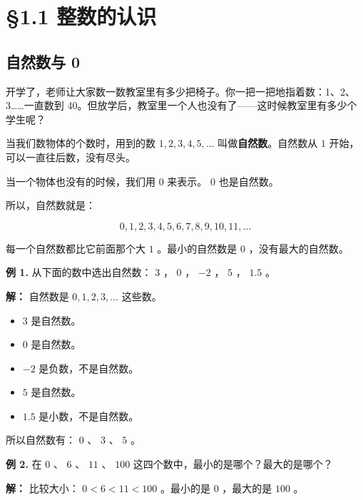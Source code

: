 \chapter{§1.1 整数的认识}
\label{sec:1.1}




\section*{自然数与 0}


\begin{explore}


开学了，老师让大家数一数教室里有多少把椅子。你一把一把地指着数：1、2、3……一直数到 40。但放学后，教室里一个人也没有了——这时候教室里有多少个学生呢？

\end{explore}

\begin{understand}


当我们数物体的个数时，用到的数 $1, 2, 3, 4, 5, \ldots$ 叫做\textbf{自然数}。自然数从 $1$ 开始，可以一直往后数，没有尽头。

当一个物体也没有的时候，我们用 \textbf{ $0$ } 来表示。 $0$ 也是自然数。

所以，自然数就是：

\[
0, 1, 2, 3, 4, 5, 6, 7, 8, 9, 10, 11, \ldots
\]


每一个自然数都比它前面那个大 $1$ 。最小的自然数是 $0$ ，没有最大的自然数。

\end{understand}

\begin{workedexamples}


\textbf{例 1.} 从下面的数中选出自然数： $3$ ， $0$ ， $-2$ ， $5$ ， $1.5$ 。

\textbf{解：} 自然数是 $0, 1, 2, 3, \ldots$ 这些数。
\begin{itemize}
  \item $3$ 是自然数。
  \item $0$ 是自然数。
  \item $-2$ 是负数，不是自然数。
  \item $5$ 是自然数。
  \item $1.5$ 是小数，不是自然数。
\end{itemize}


所以自然数有： $0$ 、 $3$ 、 $5$ 。

\textbf{例 2.} 在 $0$ 、 $6$ 、 $11$ 、 $100$ 这四个数中，最小的是哪个？最大的是哪个？

\textbf{解：} 比较大小： $0 < 6 < 11 < 100$ 。最小的是 $0$ ，最大的是 $100$ 。

\end{workedexamples}

